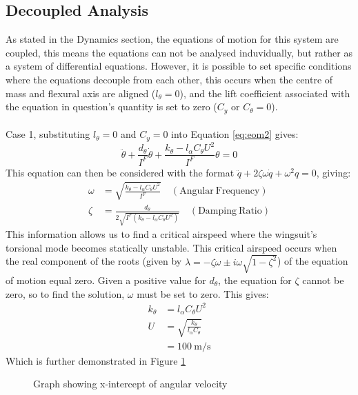 \documentclass[11pt]{article}
\begin{document}
\subsection*{Decoupled Analysis}\label{sec:decoupled_analysis}
As stated in the Dynamics section, the equations of motion for this system are coupled, this means the equations can not be analysed induvidually, but rather as a system of differential equations.
However, it is possible to set specific conditions where the equations decouple from each other, this occurs when the centre of mass and flexural axis are aligned ($l_{\theta} = 0$), and the lift coefficient associated with the equation in question's quantity is set to zero ($C_y$ or $C_{\theta} = 0 $). \\\\
Case 1, substituting $l_{\theta} = 0$ and $C_y = 0$ into Equation \ref{eq:eom2} gives:
\begin{equation}
  \ddot{\theta}+\frac{d_{\theta}}{I^F}\dot{\theta}+\frac{k_{\theta}-l_{\alpha}C_{\theta}U^2}{I^F}\theta = 0 \label{eq:decoupled1}
\end{equation}
This equation can then be considered with the format $\ddot{q} + 2\zeta\omega\dot{q}+\omega^2q = 0$, giving:
\begin{align*}
  \omega &= \sqrt{\frac{k_{\theta}-l_{\alpha}C_{\theta}U^2}{I^F}} \quad \mathrm{(Angular~Frequency)} \\
  \zeta &= \frac{d_{\theta}}{2\sqrt{I^F(k_{\theta}-l_{\alpha}C_{\theta}U^2)}} \quad \mathrm{(Damping~Ratio)}
\end{align*}
This information allows us to find a critical airspeed where the wingsuit's torsional mode becomes statically unstable.
This critical airspeed occurs when the real component of the roots (given by $\lambda = -\zeta\omega\pm i\omega\sqrt{1-\zeta^2}$) of the equation of motion equal zero.
Given a positive value for $d_{\theta}$, the equation for $\zeta$ cannot be zero, so to find the solution, $\omega$ must be set to zero. This gives:
\begin{align*}
  k_{\theta} &= l_{\alpha}C_{\theta}U^2 \\
  U &= \sqrt{\frac{k_{\theta}}{l_{\alpha}C_{\theta}}}\\
    &= 100~\mathrm{m/s}
\end{align*}
Which is further demonstrated in Figure \ref{fig:decoupled_case1}
\begin{figure}[h!]
  \centering
  \caption{Graph showing x-intercept of angular velocity}\label{fig:decoupled_case1}
\end{figure}
\end{document}

